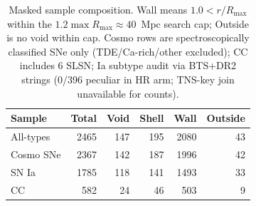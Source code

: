 \begin{table}
\caption{Masked sample composition. Wall means $1.0<r/R_{\max}$ within the $1.2\max R_{\max}\approx40$~Mpc search cap; Outside is no void within cap. Cosmo rows are spectroscopically classified SNe only (TDE/Ca-rich/other excluded); CC includes 6 SLSN; Ia subtype audit via BTS+DR2 strings (0/396 peculiar in HR arm; TNS-key join unavailable for counts).}
\label{tab:counts}
{\small\setlength{\tabcolsep}{6pt}
\begin{tabular}{lrrrrr}
\hline
Sample & Total & Void & Shell & Wall & Outside \\
\hline
All-types & 2465 & 147 & 195 & 2080 & 43 \\
Cosmo SNe & 2367 & 142 & 187 & 1996 & 42 \\
SN Ia & 1785 & 118 & 141 & 1493 & 33 \\
CC & 582 & 24 & 46 & 503 & 9 \\
\hline
\end{tabular}}
\end{table}
